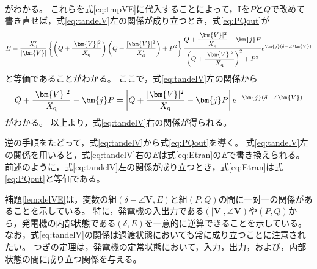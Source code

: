 \documentclass[tombow,dvipdfmx]{corona-a5}
\begin{document}
\begin{証明}
\begin{align*}
\end{align*}
がわかる。
これらを式\ref{eq:tmpVE}に代入することによって，$\bm{I}$を$P$と$Q$で改めて書き直せば，式\ref{eq:tandelV}左の関係が成り立つとき，式\ref{eq:PQout}が
\begin{align}\label{eq:Etran}
E=
\frac{X_{\rm d}'}{|\bm{V}| } 
\left\{
\left(Q + \frac{|\bm{V}|^2}{X_{\rm q}} \right) \left(Q + \frac{|\bm{V}|^2}{X_{\rm d}'} \right) +P^2
\right\}
\frac{  Q + \frac{|\bm{V}|^2}{X_{\rm q}} - \bm{j} P }
{   \left( Q + \frac{|\bm{V}|^2}{X_{\rm q}} \right)^2 + P^2   }
e^{\bm{j}(\delta - \angle \bm{V})}
\end{align}
と等価であることがわかる。
ここで，式\ref{eq:tandelV}左の関係から
\begin{align*}
Q + \frac{|\bm{V}|^2}{X_{\rm q}} - \bm{j} P
= 
\left|Q + \frac{|\bm{V}|^2}{X_{\rm q}} - \bm{j} P \right|
e^{-\bm{j}(\delta - \angle \bm{V})}
\end{align*}
がわかる。
以上より，式\ref{eq:tandelV}右の関係が得られる。

逆の手順をたどって，式\ref{eq:tandelV}から式\ref{eq:PQout}を導く。
式\ref{eq:tandelV}左の関係を用いると，式\ref{eq:tandelV}右の$E$は式\ref{eq:Etran}の$E$で書き換えられる。
前述のように，式\ref{eq:tandelV}左の関係が成り立つとき，式\ref{eq:Etran}は式\ref{eq:PQout}と等価である。
\end{証明}

補題\ref{lem:delVE}は，変数の組$(\delta - \angle \bm{V},E)$と組$(P,Q)$の間に一対一の関係があることを示している。
特に，発電機の入出力である$(|\bm{V}|,\angle \bm{V})$や$(P,Q)$から，発電機の内部状態である$(\delta,E)$を一意的に逆算できることを示している。
なお，式\ref{eq:tandelV}の関係は過渡状態においても常に成り立つことに注意されたい。
つぎの定理は，発電機の定常状態において，入力，出力，および，内部状態の間に成り立つ関係を与える。
\end{document}
